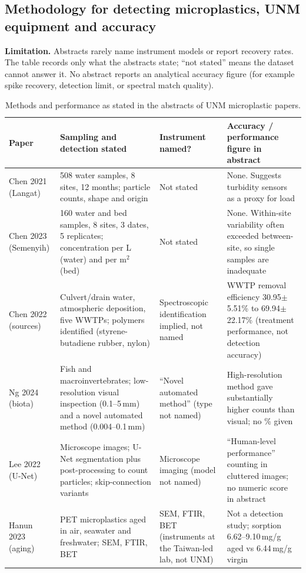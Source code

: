 \documentclass[11pt,a4paper]{article}
\newcommand{\flag}[1]{\textcolor{accent}{\textbf{#1}}}
\begin{document}
\subsection{Methodology for detecting microplastics, UNM equipment and accuracy}\label{sec:method}
\flag{Limitation.} Abstracts rarely name instrument models or report recovery rates. The table records only what the abstracts state; ``not stated'' means the dataset cannot answer it. No abstract reports an analytical accuracy figure (for example spike recovery, detection limit, or spectral match quality).

\begin{table}[H]\centering\scriptsize
\begin{tabularx}{\textwidth}{@{}p{1.6cm}XXX@{}}
\toprule Paper & Sampling and detection stated & Instrument named? & Accuracy / performance figure in abstract \\\midrule
Chen 2021 (Langat) \cite{chen21a} & 508 water samples, 8 sites, 12 months; particle counts, shape and origin & Not stated & None. Suggests turbidity sensors as a proxy for load \\
Chen 2023 (Semenyih) \cite{chen23} & 160 water and bed samples, 8 sites, 3 dates, 5 replicates; concentration per L (water) and per m$^2$ (bed) & Not stated & None. Within-site variability often exceeded between-site, so single samples are inadequate \\
Chen 2022 (sources) \cite{chen22} & Culvert/drain water, atmospheric deposition, five WWTPs; polymers identified (styrene-butadiene rubber, nylon) & Spectroscopic identification implied, not named & WWTP removal efficiency 30.95$\pm$5.51\% to 69.94$\pm$22.17\% (treatment performance, not detection accuracy) \\
Ng 2024 (biota) \cite{ng24} & Fish and macroinvertebrates; low-resolution visual inspection (0.1--5\,mm) and a novel automated method (0.004--0.1\,mm) & ``Novel automated method'' (type not named) & High-resolution method gave substantially higher counts than visual; no \% given \\
Lee 2022 (U-Net) \cite{lee22} & Microscope images; U-Net segmentation plus post-processing to count particles; skip-connection variants & Microscope imaging (model not named) & ``Human-level performance'' counting in cluttered images; no numeric score in abstract \\
Hanun 2023 (aging) \cite{hanun23} & PET microplastics aged in air, seawater and freshwater; SEM, FTIR, BET & SEM, FTIR, BET (instruments at the Taiwan-led lab, not UNM) & Not a detection study; sorption 6.62--9.10\,mg/g aged vs 6.44\,mg/g virgin \\
\bottomrule\end{tabularx}
\caption{Methods and performance as stated in the abstracts of UNM microplastic papers.}
\end{table}
\end{document}
